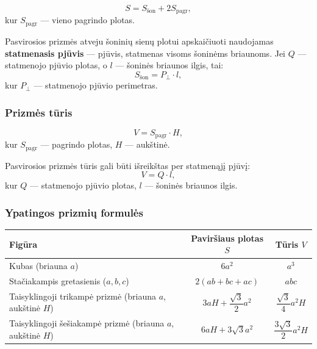 \begin{tcolorbox}[colback=blue!5!white, colframe=blue!50!black, title=Viso paviršiaus plotas]
\[
    S = S_{\text{šon}} + 2S_{\text{pagr}},
\]
kur $S_{\text{pagr}}$ --- vieno pagrindo plotas.
\end{tcolorbox}

\begin{remark}
Pasvirosios prizmės atveju šoninių sienų plotui apskaičiuoti naudojamas \textbf{statmenasis pjūvis} --- pjūvis, statmenas visoms šoninėms briaunoms. Jei $Q$ --- statmenojo pjūvio plotas, o $l$ --- šoninės briaunos ilgis, tai:
\[
    S_{\text{šon}} = P_{\perp} \cdot l,
\]
kur $P_{\perp}$ --- statmenojo pjūvio perimetras.
\end{remark}

\subsubsection*{Prizmės tūris}

\begin{tcolorbox}[colback=green!5!white, colframe=green!50!black, title=Prizmės tūrio formulė]
\[
    V = S_{\text{pagr}} \cdot H,
\]
kur $S_{\text{pagr}}$ --- pagrindo plotas, $H$ --- aukštinė.
\end{tcolorbox}

\begin{remark}
Pasvirosios prizmės tūris gali būti išreikštas per statmenąjį pjūvį:
\[
    V = Q \cdot l,
\]
kur $Q$ --- statmenojo pjūvio plotas, $l$ --- šoninės briaunos ilgis.
\end{remark}

\subsubsection*{Ypatingos prizmių formulės}

\begin{center}
\renewcommand{\arraystretch}{1.8}
\begin{tabular}{|l|c|c|}
\hline
\textbf{Figūra} & \textbf{Paviršiaus plotas $S$} & \textbf{Tūris $V$} \\
\hline
Kubas (briauna $a$) & $6a^2$ & $a^3$ \\
\hline
Stačiakampis gretasienis ($a, b, c$) & $2(ab + bc + ac)$ & $abc$ \\
\hline
Taisyklingoji trikampė prizmė (briauna $a$, aukštinė $H$) & $3aH + \dfrac{\sqrt{3}}{2}a^2$ & $\dfrac{\sqrt{3}}{4}a^2 H$ \\
\hline
Taisyklingoji šešiakampė prizmė (briauna $a$, aukštinė $H$) & $6aH + 3\sqrt{3}a^2$ & $\dfrac{3\sqrt{3}}{2}a^2 H$ \\
\hline
\end{tabular}
\end{center}

